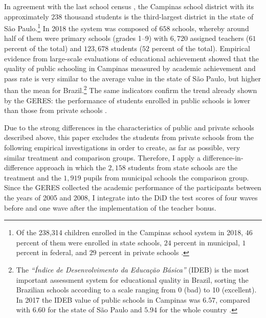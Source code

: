 \documentclass[a4paper, 12pt]{article}
\begin{document}
In agreement with the last school census \citep[see][]{Sinopse2018}, the Campinas school district with its approximately $238$ thousand students is the third-largest district in the state of São Paulo.\footnote{Of the 238,314 children enrolled in the Campinas school system in 2018, $46$ percent of them were enrolled in state schools, $24$ percent in municipal, $1$ percent in federal, and $29$ percent in private schools \citep{Sinopse2018}.} In 2018 the system was composed of $658$ schools, whereby around half of them were primary schools (grades 1–9) with $6,720$ assigned teachers ($61$ percent of the total) and $123,678$ students ($52$ percent of the total). Empirical evidence from large-scale evaluations of educational achievement showed that the quality of public schooling in Campinas \textemdash measured by academic achievement and pass rate \textemdash is very similar to the average value in the state of São Paulo, but higher than the mean for Brazil.\footnote{The \textit{``Índice de Desenvolvimento da Educação Básica''} (IDEB) is the most important assessment system for educational quality in Brazil, sorting the Brazilian schools according to a scale ranging from 0 (bad) to 10 (excellent). In 2017 the IDEB value of public schools in Campinas was $6.57$, compared with $6.60$ for the state of São Paulo and $5.94$ for the whole country \citep[see][]{IDEB2019}.} The same indicators confirm the trend already shown by the GERES: the performance of students enrolled in public schools is lower than those from private schools \citep[see][]{IDEB2019}.


Due to the strong differences in the characteristics of public and private schools described above, this paper excludes the students from private schools from the following empirical investigations in order to create, as far as possible, very similar treatment and comparison groups. Therefore, I apply a difference-in-difference approach in which the $2,158$ students from state schools are the treatment and the $1,919$ pupils from municipal schools the comparison group. Since the GERES collected the academic performance of the participants between the years of 2005 and 2008, I integrate into the DiD the test scores of four waves before and one wave after the implementation of the teacher bonus.

\end{document}
